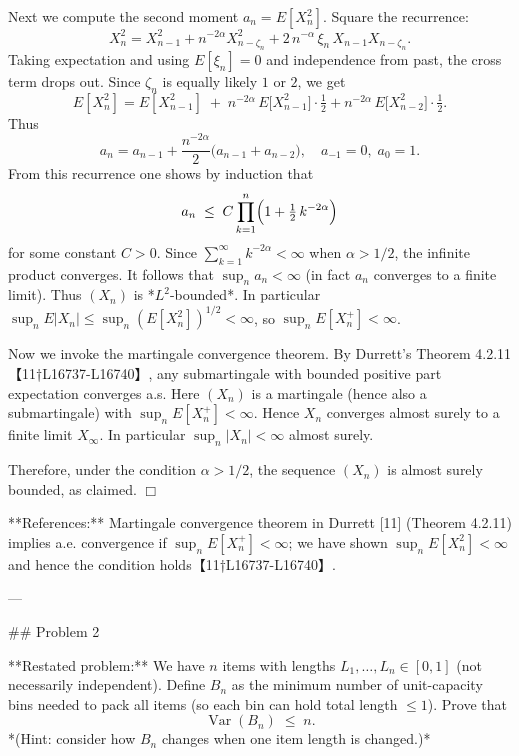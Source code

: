 \documentclass[11pt]{article}
\DeclareMathOperator{\Var}{Var}
\begin{document}
Next we compute the second moment $a_n=E[X_n^2]$. Square the recurrence:
\[
X_n^2 = X_{n-1}^2 + n^{-2\alpha} X_{n-\zeta_n}^2 + 2\,n^{-\alpha}\,\xi_n\,X_{n-1}X_{n-\zeta_n}.
\]
Taking expectation and using $E[\xi_n]=0$ and independence from past, the cross term drops out. Since $\zeta_n$ is equally likely $1$ or $2$, we get
\[
E[X_n^2]
= E[X_{n-1}^2] \;+\; n^{-2\alpha}\,E\bigl[X_{n-1}^2\bigr]\cdot\tfrac12 + n^{-2\alpha}\,E\bigl[X_{n-2}^2\bigr]\cdot\tfrac12.
\]
Thus
\[
a_n = a_{n-1} + \frac{n^{-2\alpha}}{2}\bigl(a_{n-1}+a_{n-2}\bigr),
\quad a_{-1}=0,\;a_0=1.
\]
From this recurrence one shows by induction that
\[
a_n \;\le\; C\prod_{k=1}^n\Bigl(1 + \tfrac12\,k^{-2\alpha}\Bigr)
\]
for some constant $C>0$. Since $\sum_{k=1}^\infty k^{-2\alpha}<\infty$ when $\alpha>1/2$, the infinite product converges. It follows that $\sup_n a_n <\infty$ (in fact $a_n$ converges to a finite limit). Thus $(X_n)$ is *$L^2$-bounded*. In particular $\sup_n E|X_n|\le \sup_n (E[X_n^2])^{1/2}<\infty$, so $\sup_n E[X_n^+]<\infty$.

Now we invoke the martingale convergence theorem. By Durrett’s Theorem 4.2.11【11†L16737-L16740】, any submartingale with bounded positive part expectation converges a.s. Here $(X_n)$ is a martingale (hence also a submartingale) with $\sup_nE[X_n^+]<\infty$. Hence $X_n$ converges almost surely to a finite limit $X_\infty$. In particular $\sup_n |X_n|<\infty$ almost surely.

Therefore, under the condition $\alpha>1/2$, the sequence $(X_n)$ is almost surely bounded, as claimed. $\Box$

**References:** Martingale convergence theorem in Durrett [11] (Theorem 4.2.11) implies a.e. convergence if $\sup_nE[X_n^+]<\infty$; we have shown $\sup_nE[X_n^2]<\infty$ and hence the condition holds【11†L16737-L16740】.

---

\#\# Problem 2

**Restated problem:** We have $n$ items with lengths $L_1,\dots,L_n\in[0,1]$ (not necessarily independent). Define $B_n$ as the minimum number of unit-capacity bins needed to pack all items (so each bin can hold total length $\le1$). Prove that
\[
\Var(B_n)\;\le\; n.
\]
*(Hint: consider how $B_n$ changes when one item length is changed.)*
\end{document}
